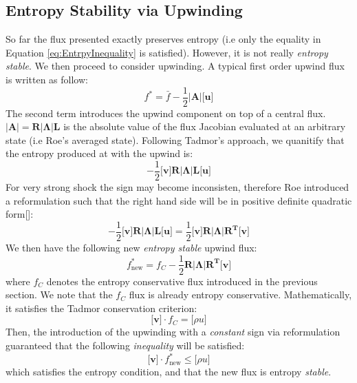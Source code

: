 \documentclass[a4paper]{article}
\numberwithin{equation}{section}
\begin{document}
\subsection{Entropy Stability via Upwinding}
So far the flux presented exactly preserves entropy (i.e only the equality in Equation \ref{eq:EntrpyInequality} is satisfied). However, it is not really \textit{entropy stable}. We then proceed to consider upwinding. A typical first order upwind flux is written as follow:
\begin{equation} \label{eq:oldFlux}
    f^* = \bar{f} - \frac{1}{2}\left|\mathbf{A} \right| \big[\mathbf{u}\big]
\end{equation}
The second term introduces the upwind component on top of a central flux. $\left|\mathbf{A}\right| = \mathbf{R \left|\Lambda \right| L }$ is the absolute value of the flux Jacobian evaluated at an arbitrary state (i.e Roe's averaged state). Following Tadmor's approach, we quanitify that the entropy produced at with the upwind is:
\begin{equation}
    -\frac{1}{2} \big[\mathbf{v}\big] \mathbf{R \left|\Lambda \right| L } \big[\mathbf{u}\big]
\end{equation}
For very strong shock the sign may become inconsisten, therefore Roe introduced a reformulation such that the right hand side will be in positive definite quadratic form[]:
\begin{equation}
    -\frac{1}{2} \big[\mathbf{v}\big] \mathbf{R \left|\Lambda \right| L } \big[\mathbf{u}\big] = \frac{1}{2}\big[\mathbf{v}\big] \mathbf{R \left|\Lambda \right| R^T } \big[\mathbf{v}\big]
\end{equation}
We then have the following new \textit{entropy stable} upwind flux:
\begin{equation} \label{eq:newFlux}
    f^*_{\text{new}} = f_C - \frac{1}{2} \mathbf{R \left|\Lambda \right| R^T } \big[\mathbf{v}\big]
\end{equation}
where $f_C$ denotes the entropy conservative flux introduced in the previous section. We note that the $f_C$ flux is already entropy conservative. Mathematically, it satisfies the Tadmor conservation criterion: 
\begin{equation}
    \big[\mathbf{v}\big]\cdot f_C = \big[\rho u\big]
\end{equation}
Then, the introduction of the upwinding with a \textit{constant} sign via reformulation guaranteed that the following \textit{inequality} will be satisfied:
\begin{equation}
    \big[\mathbf{v}\big] \cdot f^*_{\text{new}} \leq \big[\rho u\big]
\end{equation}
which satisfies the entropy condition, and that the new flux is entropy \textit{stable}. 
\end{document}
